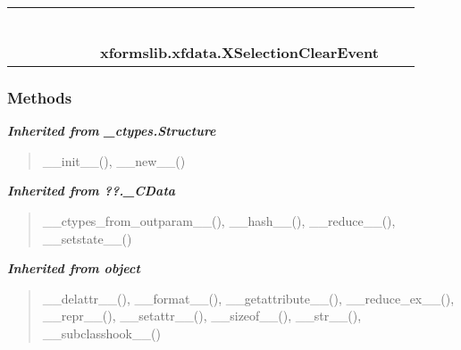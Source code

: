     \label{xformslib:xfdata:XSelectionClearEvent}
\begin{tabular}{cccccccccc}
\multicolumn{2}{r}{\settowidth{\BCL}{object}\multirow{2}{\BCL}{object}}
&&
&&
&&
  \\\cline{3-3}
  &&\multicolumn{1}{c|}{}
&&
&&
&&
  \\
\multicolumn{4}{r}{\settowidth{\BCL}{??.\_CData}\multirow{2}{\BCL}{??.\_CData}}
&&
&&
  \\\cline{5-5}
  &&&&\multicolumn{1}{c|}{}
&&
&&
  \\
\multicolumn{6}{r}{\settowidth{\BCL}{\_ctypes.Structure}\multirow{2}{\BCL}{\_ctypes.Structure}}
&&
  \\\cline{7-7}
  &&&&&&\multicolumn{1}{c|}{}
&&
  \\
&&&&&&\multicolumn{2}{l}{\textbf{xformslib.xfdata.XSelectionClearEvent}}
\end{tabular}



  \subsubsection{Methods}


\large{\textbf{\textit{Inherited from \_ctypes.Structure}}}

\begin{quote}
\_\_init\_\_(), \_\_new\_\_()
\end{quote}

\large{\textbf{\textit{Inherited from ??.\_CData}}}

\begin{quote}
\_\_ctypes\_from\_outparam\_\_(), \_\_hash\_\_(), \_\_reduce\_\_(), \_\_setstate\_\_()
\end{quote}

\large{\textbf{\textit{Inherited from object}}}

\begin{quote}
\_\_delattr\_\_(), \_\_format\_\_(), \_\_getattribute\_\_(), \_\_reduce\_ex\_\_(), \_\_repr\_\_(), \_\_setattr\_\_(), \_\_sizeof\_\_(), \_\_str\_\_(), \_\_subclasshook\_\_()
\end{quote}

